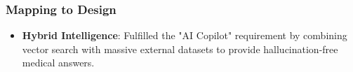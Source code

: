 \documentclass[a4paper,12pt]{article}
\begin{document}
\subsubsection*{Mapping to Design}
\begin{itemize}
    \item \textbf{Hybrid Intelligence}: Fulfilled the "AI Copilot" requirement by combining vector search with massive external datasets to provide hallucination-free medical answers.
\end{itemize}
\end{document}
